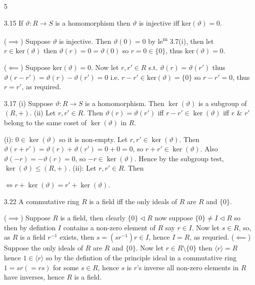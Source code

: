 \documentclass[8pt]{extarticle}
\makeatletter
\newcommand{\fitdisplay}[1]{%
  \par\vspace{-1pt}\noindent
  \sbox{\fitdisplaybox}{#1}%
  \makebox[\columnwidth][c]{%
    \ifdim\wd\fitdisplaybox>\columnwidth
      \resizebox{\columnwidth}{!}{#1}%
    \else
      \usebox{\fitdisplaybox}%
    \fi
  }%
  \par\vspace{-1pt}%
}
\renewenvironment{proof}[1][\proofname]{%
  \par%
  \pushQED{\qed}%
  \normalfont
  \topsep=2pt\partopsep=0pt\parsep=0pt\itemsep=0pt%
  \trivlist
  \item[\hskip\labelsep\itshape #1\@addpunct{.}]\ignorespaces
}{%
  \popQED\endtrivlist\@endpefalse
  \vspace{-1pt}%
}
\makeatother
\begin{document}
\begin{multicols*}{5}
        \begin{lemma}{3.15}
            If \(\vartheta: R\to S\) is a homomorphism then \(\vartheta\) is injective iff \(\text{ker}(\vartheta)={0}\).
        \end{lemma}

        \begin{proof}
            (\(\implies\)) Suppose \(\vartheta\) is injective. Then \(\vartheta(0)=0\) by le\textsuperscript{m} 3.7(i), then let \(r\in\text{ker}(\vartheta)\) then \(\vartheta(r)=0=\vartheta(0)\) so \(r=0\in\{0\}\), thus \(\text{ker}(\vartheta)={0}\).

            (\(\impliedby\)) Suppose \(\text{ker}(\vartheta)={0}\). Now let \(r,r'\in R\) s.t. \(\vartheta(r)=\vartheta(r')\) thus \(\vartheta(r-r')=\vartheta(r)-\vartheta(r')=0\) i.e. \(r-r'\in\text{ker}(\vartheta)=\{0\}\) so \(r-r'=0\), thus \(r=r'\), as required.
        \end{proof}

        \begin{lemma}{3.17}
            (i) Suppose \(\vartheta:R\to S\) is a homomorphism. Then \(\ker(\vartheta)\) is a subgroup of \((R,+)\). (ii) Let \(r,r'\in R\). Then \(\vartheta(r)=\vartheta(r')\) iff \(r-r'\in\ker(\vartheta)\) iff \(r\) \& \(r'\) belong to the same coset of \(\ker(\vartheta)\) in \(R\).
        \end{lemma}

        \begin{proof}
            (i): \(0\in\ker(\vartheta)\) so it is non-empty. Let \(r,r'\in\ker(\vartheta)\). Then \(\vartheta(r+r')=\vartheta(r)+\vartheta(r')=0+0=0\), so \(r+r'\in\ker(\vartheta)\). Also \(\vartheta(-r)=-\vartheta(r)=0\), so \(-r\in\ker(\vartheta)\). Hence by the subgroup test, \(\ker(\vartheta)\le(R,+)\). (ii): Let \(r,r'\in R\). Then
            \fitdisplay{\(\vartheta(r)=\vartheta(r')\Leftrightarrow\vartheta(r-r')=0\Leftrightarrow r-r'\in\ker(\vartheta)\)}
            \(\Leftrightarrow r+\ker(\vartheta)=r'+\ker(\vartheta)\).
        \end{proof}

        \begin{proposition}{3.22}
            A commutative ring \(R\) is a field iff the only ideals of \(R\) are \(R\) and \(\{0\}\).
        \end{proposition}

        \begin{proof}
            (\(\implies\)) Suppose \(R\) is a field, then clearly \(\{0\}\lhd R\) now suppose \(\{0\}\ne I\lhd R\) so then by defintion \(I\) contains a non-zero element of \(R\) say \(r\in I\). Now let \(s\in R\), so, as \(R\) is a field \(r^{-1}\) exists, then \(s=(sr^{-1})r\in I\), hence \(I=R\), as requried.
            (\(\impliedby\)) Suppose the only ideals of \(R\) are \(R\) and \(\{0\}\). Now let \(r\in R\setminus\{0\}\) then \(\langle r\rangle=R\) hence \(1\in\langle r\rangle\) so by the defintion of the principle ideal in a commutative ring \(1=sr(=rs)\) for some \(s\in R\), hence \(s\) is \(r\)'s inverse all non-zero elements in \(R\) have inverses, hence \(R\) is a field.
        \end{proof}


\end{multicols*}
\end{document}
